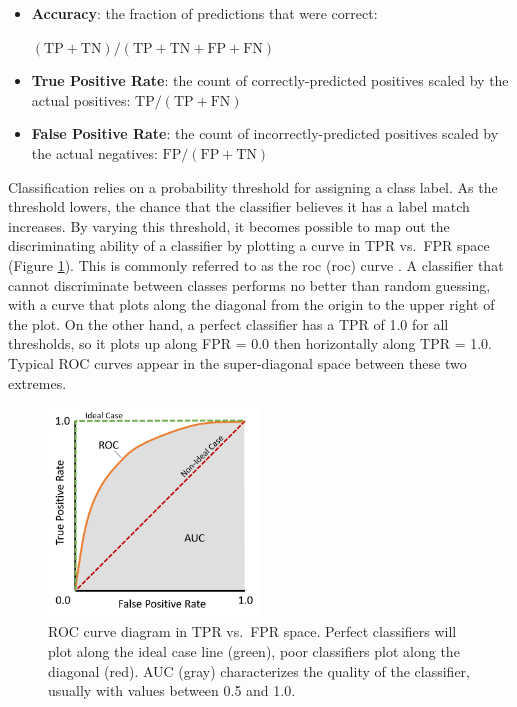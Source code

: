 \begin{itemize}[itemsep=2pt]
\item \textbf{Accuracy}: the fraction of predictions that were correct:\par
$(\mathrm{TP}+\mathrm{TN})/(\mathrm{TP}+\mathrm{TN}+\mathrm{FP}+\mathrm{FN})$
\par
\item \textbf{True Positive Rate}: the count of correctly-predicted positives scaled by the actual positives: ${\mathrm{TP}}/({\mathrm {TP}}+{\mathrm {FN}})$
\item \textbf{False Positive Rate}: the count of incorrectly-predicted positives scaled by the actual negatives: ${\mathrm {FP}}/({\mathrm {FP}}+{\mathrm {TN}})$
\end{itemize}

Classification relies on a probability threshold for assigning a class label. As the threshold lowers, the chance that the classifier believes it has a label match increases. By varying this threshold, it becomes possible to map out the discriminating ability of a classifier by plotting a curve in TPR vs.\ FPR space (Figure \ref{fig:roc}). This is commonly referred to as the \acrlong{roc} (\acrshort{roc}) curve \citep{fawcett_introduction_2006}. A classifier that cannot discriminate between classes performs no better than random guessing, with a curve that plots along the diagonal from the origin to the upper right of the plot. On the other hand, a perfect classifier has a TPR of 1.0 for all thresholds, so it plots up along FPR = 0.0 then horizontally along TPR = 1.0. Typical ROC curves appear in the super-diagonal space between these two extremes.

\begin{figure}[!htp]
\centering
\includegraphics[width=0.5\textwidth]{templates/images/Figure-ROC_AUC_Diagram.png}
\caption[Receiver Operating Characteristic diagram]{ROC curve diagram in TPR vs.\ FPR space. Perfect classifiers will plot along the ideal case line (green), poor classifiers plot along the diagonal (red). AUC (gray) characterizes the quality of the classifier, usually with values between 0.5 and 1.0.}
\label{fig:roc}
\end{figure}


